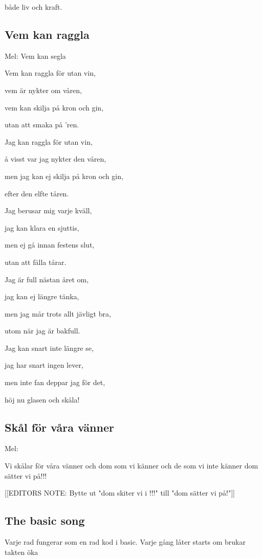 både liv och kraft. 

\subsection{\textbf{Vem kan raggla}}

Mel: Vem kan segla\bigskip

Vem kan raggla för utan vin,

vem är nykter om våren,

vem kan skilja på kron och gin,

utan att smaka på 'ren.\bigskip

Jag kan raggla för utan vin,

å visst var jag nykter den våren,

men jag kan ej skilja på kron och gin,

efter den elfte tåren.\bigskip

Jag berusar mig varje kväll,

jag kan klara en sjuttis,

men ej gå innan festens slut,

utan att fälla tårar.\bigskip

Jag är full nästan året om,

jag kan ej längre tänka,

men jag mår trots allt jävligt bra,

utom när jag är bakfull.\bigskip

Jag kan snart inte längre se,

jag har snart ingen lever,

men inte fan deppar jag för det,

höj nu glasen och skåla! \bigskip

\subsection{\textbf{Skål för våra vänner }}

Mel: \bigskip

Vi skålar för våra vänner
och dom som vi känner
och de som vi inte känner
dom sätter vi på!!!

[[EDITORS NOTE: Bytte ut "dom skiter vi i !!!" till "dom sätter vi på!"]]

\subsection{\textbf{The basic song}}

Varje rad fungerar som en rad kod i basic.
Varje gång låter starts om brukar takten öka

